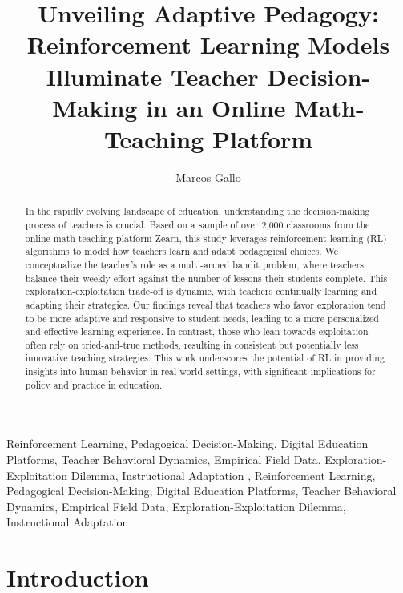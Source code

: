 \documentclass[
  number,
  preprint,
  3p,
  onecolumn]{elsarticle}
\begin{document}
\begin{frontmatter}
\title{Unveiling Adaptive Pedagogy: Reinforcement Learning Models
Illuminate Teacher Decision-Making in an Online Math-Teaching Platform}
\author[]{Marcos Gallo%
%
}




        
\begin{abstract}
In the rapidly evolving landscape of education, understanding the
decision-making process of teachers is crucial. Based on a sample of
over 2,000 classrooms from the online math-teaching platform Zearn, this
study leverages reinforcement learning (RL) algorithms to model how
teachers learn and adapt pedagogical choices. We conceptualize the
teacher's role as a multi-armed bandit problem, where teachers balance
their weekly effort against the number of lessons their students
complete. This exploration-exploitation trade-off is dynamic, with
teachers continually learning and adapting their strategies. Our
findings reveal that teachers who favor exploration tend to be more
adaptive and responsive to student needs, leading to a more personalized
and effective learning experience. In contrast, those who lean towards
exploitation often rely on tried-and-true methods, resulting in
consistent but potentially less innovative teaching strategies. This
work underscores the potential of RL in providing insights into human
behavior in real-world settings, with significant implications for
policy and practice in education.
\end{abstract}





\begin{keyword}
    Reinforcement Learning, Pedagogical Decision-Making, Digital
Education Platforms, Teacher Behavioral Dynamics, Empirical Field Data,
Exploration-Exploitation Dilemma, Instructional Adaptation \sep 
    Reinforcement Learning, Pedagogical Decision-Making, Digital
Education Platforms, Teacher Behavioral Dynamics, Empirical Field Data,
Exploration-Exploitation Dilemma, Instructional Adaptation
\end{keyword}
\end{frontmatter}
    
\section{Introduction}\label{introduction}
\end{document}
